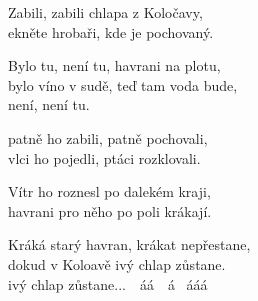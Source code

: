 
\ve{}
Zabili, zabili chlapa z Koločavy,\\
ekněte hrobaři, kde je pochovaný.

\cho{}
Bylo tu, není tu, havrani na plotu,\\
bylo víno v sudě, teď tam voda bude,\\
není, není tu.

\ve{}
patně ho zabili, patně pochovali,\\
vlci ho pojedli, ptáci rozklovali.

\cho{}

\ve{}
Vítr ho roznesl po dalekém kraji,\\
havrani pro něho po poli krákají.

\cho{}

\ve{}
Kráká starý havran, krákat nepřestane,\\
dokud v Koloavě ivý chlap zůstane.\\
ivý chlap zůstane...\ \  áá\ \  á \  ááá

\esong{}